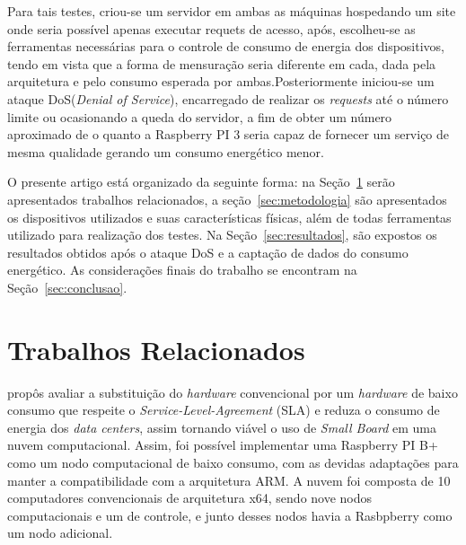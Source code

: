 \documentclass[12pt]{article}
\begin{document}
  Para tais testes, criou-se um servidor em ambas as máquinas hospedando um site onde seria possível apenas executar requets de acesso, após, escolheu-se as ferramentas necessárias para o controle de consumo de energia dos dispositivos, tendo em vista que a forma de mensuração seria diferente em cada, dada pela arquitetura e pelo consumo esperada por ambas.Posteriormente iniciou-se um ataque DoS(\textit{Denial of Service}), encarregado de realizar os \textit{requests} até o número limite ou ocasionando a queda do servidor, a fim de obter um número aproximado de o quanto a Raspberry PI 3 seria capaz de fornecer um serviço de mesma qualidade gerando um consumo energético menor.



  O presente artigo está organizado da seguinte forma: na Seção~\ref{sec:trabCorrelatos} serão apresentados trabalhos relacionados, a seção~\ref{sec:metodologia} são apresentados os dispositivos utilizados e suas características físicas, além de todas ferramentas utilizado para realização dos testes. Na Seção~\ref{sec:resultados}, são expostos os resultados obtidos após o ataque DoS e a captação de dados do consumo energético. As considerações finais do trabalho se encontram na Seção~\ref{sec:conclusao}.


\section{Trabalhos Relacionados} \label{sec:trabCorrelatos}
  
 
   \cite{Joao} propôs avaliar a substituição do \textit{hardware} convencional por um \textit{hardware} de baixo consumo que respeite o \textit{Service-Level-Agreement} (SLA) e reduza o consumo de energia dos \textit{data centers}, assim tornando viável o uso de \textit{Small Board} em uma nuvem computacional. Assim, foi possível implementar uma Raspberry PI B+ como um nodo computacional de baixo consumo, com as devidas adaptações para manter a compatibilidade com a arquitetura ARM. A nuvem foi composta de 10 computadores convencionais de arquitetura x64, sendo nove nodos computacionais e um de controle, e junto desses nodos havia a Rasbpberry como um nodo adicional.

\end{document}
